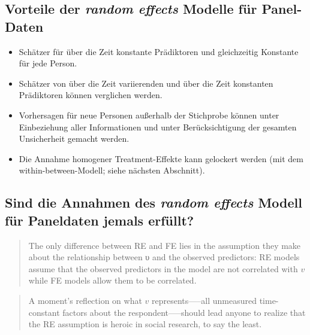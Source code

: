\documentclass[
]{book}
\providecommand{\tightlist}{%
  \setlength{\itemsep}{0pt}\setlength{\parskip}{0pt}}
\begin{document}
\hypertarget{vorteile-der-random-effects-modelle-fuxfcr-panel-daten}{%
\subsection*{\texorpdfstring{Vorteile der \emph{random effects} Modelle für Panel-Daten}{Vorteile der random effects Modelle für Panel-Daten}}\label{vorteile-der-random-effects-modelle-fuxfcr-panel-daten}}

\begin{itemize}
\tightlist
\item
  Schätzer für über die Zeit konstante Prädiktoren und gleichzeitig Konstante für jede Person.
\item
  Schätzer von über die Zeit variierenden und über die Zeit konstanten Prädiktoren können verglichen werden.
\item
  Vorhersagen für neue Personen außerhalb der Stichprobe können unter Einbeziehung aller Informationen und unter Berücksichtigung der gesamten Unsicherheit gemacht werden.
\item
  Die Annahme homogener Treatment-Effekte kann gelockert werden (mit dem within-between-Modell; siehe nächsten Abschnitt).
\end{itemize}

\hypertarget{sind-die-annahmen-des-random-effects-modell-fuxfcr-paneldaten-jemals-erfuxfcllt}{%
\subsection*{\texorpdfstring{Sind die Annahmen des \emph{random effects} Modell für Paneldaten jemals erfüllt?}{Sind die Annahmen des random effects Modell für Paneldaten jemals erfüllt?}}\label{sind-die-annahmen-des-random-effects-modell-fuxfcr-paneldaten-jemals-erfuxfcllt}}

\begin{quote}
The only difference between RE and FE lies in the assumption they make about the relationship between υ and the observed predictors: RE models assume that the observed predictors in the model are not correlated with \(v\) while FE models allow them to be correlated.
\end{quote}

\begin{quote}
A moment's reflection on what \(v\) represents-----all unmeasured time-constant factors about the respondent-----should lead anyone to realize that the RE assumption is heroic in social research, to say the least.
\end{quote}
\end{document}
